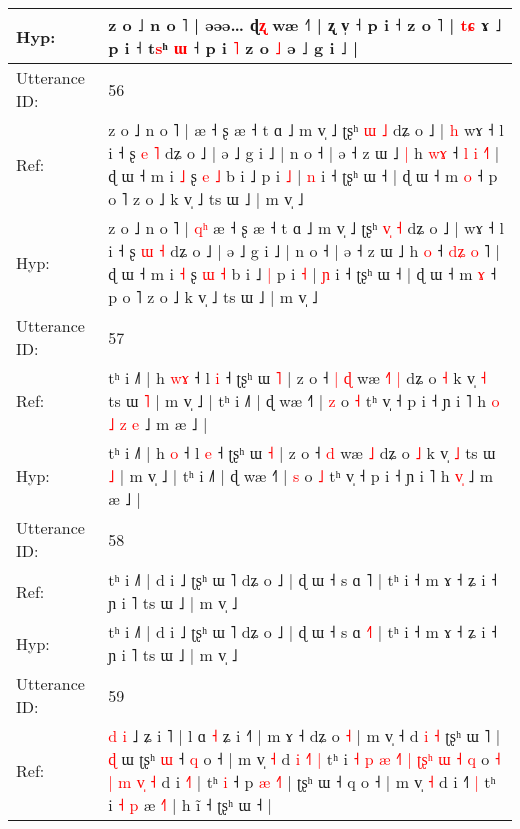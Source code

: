 \documentclass[10pt]{article}
\DeclareRobustCommand{\hl}[1]{{\textcolor{red}{#1}}}
\begin{document}
\begin{longtable}{ll}
 \\
Hyp: & z o ˩ n o ˥ | əəə… ɖ\hl{ʐ} wæ ˧˥ | \hl{}ʐ v̩ ˧ p i ˧ z o ˥ | \hl{t}\hl{ɕ} ɤ ˩ p i ˧ t\hl{s}ʰ \hl{}\hl{ɯ} ˧ p i \hl{˥} z o\hl{}\hl{} \hl{˩} ə ˩ g i ˩ |
 \\
\midrule
Utterance ID: & 56 \\
Ref: & z o ˩ n o ˥ |\hl{}\hl{}\hl{} æ ˧ ʂ æ ˧ t ɑ ˩ m v̩ ˩ ʈʂʰ \hl{}\hl{ɯ} \hl{˩} dʑ o ˩ |\hl{ }\hl{h} wɤ ˧ l i ˧ ʂ \hl{e} \hl{˥} dʑ o ˩ | ə ˩ g i ˩ | n o ˧ | ə ˧ z ɯ ˩\hl{ }\hl{|} h \hl{w}\hl{ɤ} ˧ \hl{}\hl{l} \hl{i} \hl{˧}˥ | ɖ ɯ ˧ m i \hl{˩} ʂ \hl{e} \hl{˩} b i ˩\hl{}\hl{} p i \hl{˩} | \hl{n} i ˧ ʈʂʰ ɯ ˧ | ɖ ɯ ˧ m \hl{o} ˧ p o ˥ z o ˩ k v̩ ˩ ts ɯ ˩ | m v̩ ˩
 \\
Hyp: & z o ˩ n o ˥ |\hl{ }\hl{q}\hl{ʰ} æ ˧ ʂ æ ˧ t ɑ ˩ m v̩ ˩ ʈʂʰ \hl{v}\hl{̩} \hl{˧} dʑ o ˩ |\hl{}\hl{} wɤ ˧ l i ˧ ʂ \hl{ɯ} \hl{˧} dʑ o ˩ | ə ˩ g i ˩ | n o ˧ | ə ˧ z ɯ ˩\hl{}\hl{} h \hl{}\hl{o} ˧ \hl{d}\hl{ʑ} \hl{o} \hl{}˥ | ɖ ɯ ˧ m i \hl{˧} ʂ \hl{ɯ} \hl{˧} b i ˩\hl{ }\hl{|} p i \hl{˧} | \hl{ɲ} i ˧ ʈʂʰ ɯ ˧ | ɖ ɯ ˧ m \hl{ɤ} ˧ p o ˥ z o ˩ k v̩ ˩ ts ɯ ˩ | m v̩ ˩
 \\
\midrule
Utterance ID: & 57 \\
Ref: & tʰ i ˩˥ | h \hl{w}\hl{ɤ} ˧ l \hl{i} ˧ ʈʂʰ ɯ \hl{˥} | z o ˧\hl{ }\hl{|} \hl{ɖ} wæ\hl{ }\hl{˧}\hl{˥} \hl{|} dʑ o \hl{˧} k v̩ \hl{˧} ts ɯ \hl{˥} | m v̩ ˩ | tʰ i ˩˥ | ɖ wæ ˧˥ | \hl{z} o \hl{˧} tʰ v̩ ˧ p i ˧ ɲ i ˥ h\hl{ }\hl{o}\hl{ }\hl{˩} \hl{z}\hl{ }\hl{e} ˩ m æ ˩ |
 \\
Hyp: & tʰ i ˩˥ | h \hl{}\hl{o} ˧ l \hl{e} ˧ ʈʂʰ ɯ \hl{˧} | z o ˧\hl{}\hl{} \hl{d} wæ\hl{}\hl{}\hl{} \hl{˩} dʑ o \hl{˩} k v̩ \hl{˩} ts ɯ \hl{˩} | m v̩ ˩ | tʰ i ˩˥ | ɖ wæ ˧˥ | \hl{s} o \hl{˩} tʰ v̩ ˧ p i ˧ ɲ i ˥ h\hl{}\hl{}\hl{}\hl{} \hl{}\hl{v}\hl{̩} ˩ m æ ˩ |
 \\
\midrule
Utterance ID: & 58 \\
Ref: & tʰ i ˩˥ | d i ˩ ʈʂʰ ɯ ˥ dʑ o ˩ | ɖ ɯ ˧ s ɑ \hl{}˥ | tʰ i ˧ m ɤ ˧ ʑ i ˧ ɲ i ˥ ts ɯ ˩ | m v̩ ˩
 \\
Hyp: & tʰ i ˩˥ | d i ˩ ʈʂʰ ɯ ˥ dʑ o ˩ | ɖ ɯ ˧ s ɑ \hl{˧}˥ | tʰ i ˧ m ɤ ˧ ʑ i ˧ ɲ i ˥ ts ɯ ˩ | m v̩ ˩
 \\
\midrule
Utterance ID: & 59 \\
Ref: & \hl{d} \hl{i} ˩ ʑ i ˥ | l ɑ\hl{}\hl{} \hl{˧} ʑ i ˧\hl{˥} | m ɤ ˧ dʑ o \hl{˧} | m v̩ ˧ d\hl{} \hl{i} \hl{˧} ʈʂʰ ɯ ˥ | \hl{}\hl{ɖ} ɯ\hl{}\hl{}\hl{}\hl{} ʈʂʰ \hl{}\hl{ɯ} ˧ \hl{q} o ˧ | m v̩\hl{ }\hl{˧} d\hl{ }\hl{i} \hl{˧}\hl{˥} \hl{|} tʰ i\hl{ }\hl{˧}\hl{ }\hl{p}\hl{ }\hl{æ} \hl{˧}˥\hl{ }\hl{|}\hl{ }\hl{ʈ}\hl{ʂ}\hl{ʰ} \hl{ɯ} \hl{˧} \hl{q} o\hl{ }\hl{˧}\hl{ }\hl{|}\hl{ }\hl{m}\hl{ }\hl{v}\hl{̩}\hl{ }\hl{˧} d i \hl{˧}\hl{˥} | tʰ \hl{i} ˧ p\hl{ }\hl{æ} \hl{˧}\hl{˥} | ʈʂʰ ɯ ˧ q o ˧ | m v̩\hl{ }\hl{˧} d i ˧\hl{˥}\hl{ }\hl{|} tʰ i \hl{˧} \hl{p} æ \hl{˧}\hl{˥} | h ĩ ˧ ʈʂʰ ɯ ˧ |

\end{longtable}
\end{document}

